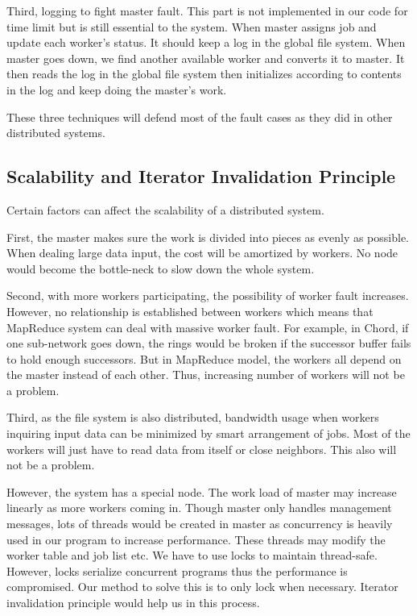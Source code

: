\documentclass[12pt]{article}
\begin{document}
Third, logging to fight master fault. This part is not implemented in our code for time limit but is still essential to the system. When master assigns job and update each worker's status. It should keep a log in the global file system. When master goes down, we find another available worker and converts it to master. It then reads the log in the global file system then initializes according to contents in the log and keep doing the master's work.

These three techniques will defend most of the fault cases as they did in other distributed systems.
   
\subsection{Scalability and Iterator Invalidation Principle}

Certain factors can affect the scalability of a distributed system.
 
First, the master makes sure the work is divided into pieces as evenly as possible. When dealing large data input, the cost will be amortized by
workers. No node would become the bottle-neck to slow down the whole system.
 
Second, with more workers participating, the possibility of worker fault increases. However, no relationship is established between workers which means that MapReduce system can deal with massive worker fault. For example, in Chord, if one sub-network goes down, the rings would be broken if the successor buffer fails to hold enough successors. But in MapReduce model, the workers all depend on the master instead of each other. Thus, increasing number of workers will not be a problem.

Third, as the file system is also distributed, bandwidth usage when workers inquiring input data can be minimized by smart arrangement of jobs. Most of the workers will just have to read data from itself or close neighbors. This also will not be a problem. 

However, the system has a special node. The work load of master may increase linearly as more workers coming in. Though master only handles management messages, lots of threads would be created in master as concurrency is heavily used in our program to increase performance. These threads may modify the worker table and job list etc. We have to use locks to maintain thread-safe. However, locks serialize concurrent programs thus the performance is compromised. Our method to solve this is to only lock when necessary. Iterator invalidation principle would help us in this process.
\end{document}
